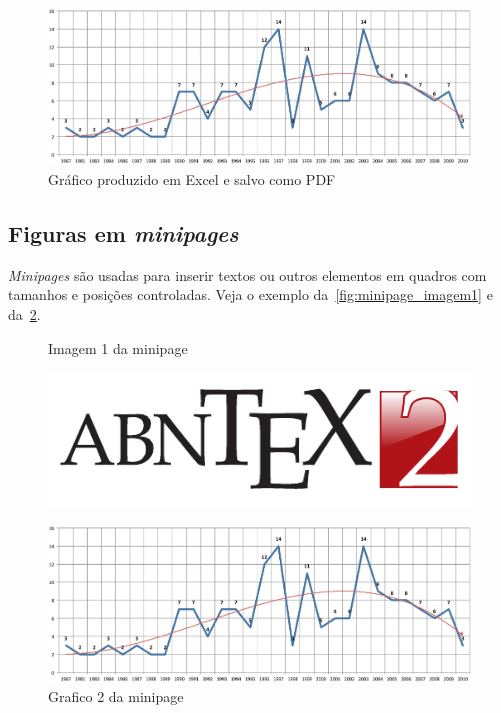 \begin{figure}[htb]
	\caption{%
		\label{fig:grafico}Gráfico produzido em Excel e salvo como PDF}
	\begin{center}
		\includegraphics[scale=0.5]{graph.pdf}
	\end{center}
\end{figure}

\subsection{Figuras em \emph{minipages}}

\emph{Minipages} são usadas para inserir textos ou outros elementos em quadros
com tamanhos e posições controladas. Veja o exemplo da~\cref{fig:minipage_imagem1} e da~\cref{fig:minipage_grafico2}.

\begin{figure}[htb]%
	\label{fig:teste}
	\centering
	\begin{minipage}{0.4\textwidth}
		\centering
		\caption{Imagem 1 da minipage}%
		\label{fig:minipage_imagem1}
		\includegraphics[scale=0.9]{logo.pdf}
	\end{minipage}
	\hfill
	\begin{minipage}{0.4\textwidth}
		\centering
		\caption{Grafico 2 da minipage}%
		\label{fig:minipage_grafico2}
		\includegraphics[scale=0.2]{graph.pdf}
	\end{minipage}
\end{figure}

